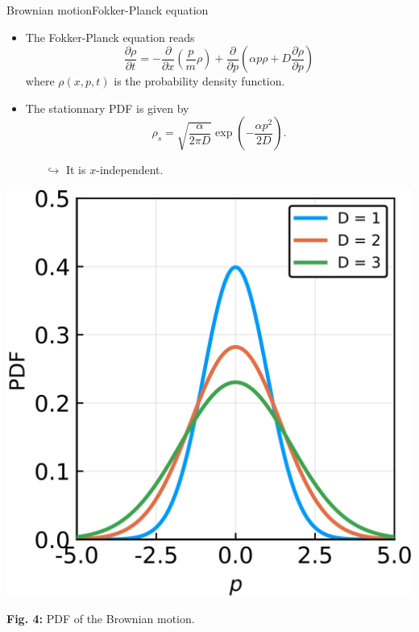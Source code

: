 \documentclass[usenames,dvipsnames,svgnames,10pt,aspectratio=169]{beamer}
\begin{document}
\begin{frame}[t, c]{Brownian motion}{Fokker-Planck equation}
	\begin{minipage}{.48\textwidth}
		\begin{itemize}
			\item The Fokker-Planck equation reads
			$$
			\frac{\partial \rho}{\partial t} = -\frac{\partial}{\partial x} \left( \frac{p}{m} \rho \right) + \frac{\partial}{\partial p} \left( \alpha p \rho + D \frac{\partial \rho}{\partial p} \right)
			$$
			where $\rho(x, p, t)$ is the probability density function.

			\medskip

			\item The stationnary PDF is given by
			$$
			\rho_s = \sqrt{\frac{\alpha}{2\pi D}} \exp \left( -\frac{\alpha p^2}{2D} \right).
			$$
			\begin{itemize}
				\item[$\hookrightarrow$] It is $x$-independent.
			\end{itemize}
		\end{itemize}
	\end{minipage}%
	\hfill
	\begin{minipage}{.48\textwidth}
		\centering
		\includegraphics[width=.75\columnwidth]{brownian_motion_pdf}

		\small{
			\textbf{Fig. 4:} PDF of the Brownian motion.
			}
	\end{minipage}

	\vspace{1cm}
\end{frame}
\end{document}
